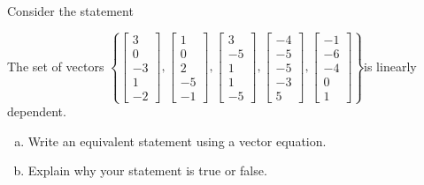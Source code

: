 
\begin{exerciseStatement}


Consider the statement 
\begin{center}\begin{minipage}{0.8\textwidth}
 The set of vectors \( \left\{ \left[\begin{array}{c}
3 \\
0 \\
-3 \\
1 \\
-2
\end{array}\right] , \left[\begin{array}{c}
1 \\
0 \\
2 \\
-5 \\
-1
\end{array}\right] , \left[\begin{array}{c}
3 \\
-5 \\
1 \\
1 \\
-5
\end{array}\right] , \left[\begin{array}{c}
-4 \\
-5 \\
-5 \\
-3 \\
5
\end{array}\right] , \left[\begin{array}{c}
-1 \\
-6 \\
-4 \\
0 \\
1
\end{array}\right] \right\} \)is linearly dependent.
\end{minipage}\end{center}
    


\begin{enumerate}[(a)]
\item  Write an equivalent statement using a vector equation.
\item  Explain why your statement is true or false.
\end{enumerate}
    
\end{exerciseStatement}
    
